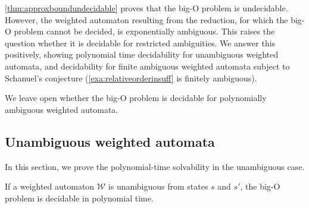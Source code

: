 \documentclass[10pt,a4paper]{amsart}
\numberwithin{equation}{section}
\theoremstyle{plain}
\theoremstyle{definition}
\theoremstyle{remark}
\newcommand\wa{\mathcal{W}}
\begin{document}
\cref{thm:approxboundundecidable} proves that the big-O problem is undecidable. However, the weighted automaton resulting from the reduction, for which the big-O problem cannot be decided, is exponentially ambiguous. This raises the question whether it is decidable for restricted ambiguities. We answer this positively, showing polynomial time decidability for  unambiguous weighted automata, and decidability for finite ambiguous weighted automata subject to Schanuel's conjecture (\cref{exa:relativeorderinsuff} is finitely ambiguous).

We leave open whether the big-O problem is decidable for polynomially ambiguous weighted automata.

\subsection{Unambiguous weighted automata}

In this section, we prove the polynomial-time solvability in the unambiguous case.

\begin{thm}\label{thm:detpolly}
If a weighted automaton $\wa$ is unambiguous from states $s$ and $s'$, the big-O problem is decidable in polynomial time.
\end{thm}
\end{document}

